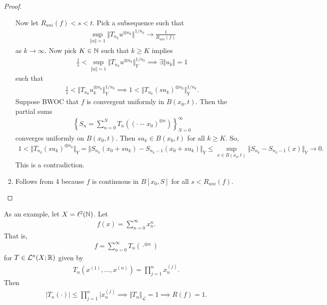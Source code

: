 \documentclass{report}
\begin{document}
\begin{proof}
\begin{enumerate}
        Now let $R_{uni}(f) < s < t$. Pick a subsequence such that 
        \begin{align*}
            \sup_{\Vert u \Vert = 1} \Vert T_{n_k} u^{\otimes n_k}\Vert^{1/n_k} \to \frac{1}{R_{uni}(f)}
        \end{align*}
        as $k \to \infty$. Now pick $K \in \NN$ such that $k \geq K$ implies 
        \begin{align*}
            \frac 1s < \sup_{\Vert u \Vert = 1} \Vert T_{n_k} u^{\otimes n_k}\Vert^{1/n_k}_Y \implies \exists \Vert u_k\Vert = 1
        \end{align*}
        such that 
        \begin{align*}
            \frac 1s < \Vert T_{n_k} u_k^{\otimes n_k}\Vert^{1/n_k}_Y \implies 1 < \Vert T_{n_k} (su_k)^{\otimes n_k}\Vert^{1/n_k}_Y.
        \end{align*}
        Suppose BWOC that $f$ is convergent uniformly in $B(x_0, t)$. Then the partial sums 
        \begin{align*}
            \left\{S_n = \sum_{n=0}^N T_n((\cdot - x_0)^{\otimes n})\right\}_{N=0}^\infty
        \end{align*}
        converges uniformly on $B(x_0, t)$. Then $su_k \in B(x_0, t)$ for all $k \geq K$. So,
        \begin{align*}
            1 < \Vert T_{n_k}(su_k)^{\otimes n_k} \Vert_Y = \Vert S_{n_k}(x_0 + su_k) - S_{n_k - 1}(x_0 + su_k)\Vert_Y \leq \sup_{x \in B(x_0, t)} \Vert S_{n_k} - S_{n_k - 1}(x) \Vert_Y \to 0.
        \end{align*}
        This is a contradiction.
        \item Follows from 4 because $f$ is continuous in $B[x_0, S]$ for all $s < R_{uni}(f)$.
    \end{enumerate}
\end{proof}
\newpage
As an example, let $X = \ell^2(\NN)$. Let 
\begin{align*}
    f(x) = \sum_{n=0}^\infty x_n^n.
\end{align*}
That is,
\begin{align*}
    f = \sum_{n=0}^\infty T_n(\cdot^{\otimes n})
\end{align*}
for $T \in \mathcal L^n(X; \RR)$ given by 
\begin{align*}
    T_n(x^{(1)}, \ldots, x^{(n)}) = \prod_{j=1}^n x^{(j)}_n.
\end{align*}
Then 
\begin{align*}
    |T_n(\cdot)| \leq \prod_{j=1}^n |x^{(j)}_n \implies \Vert T_n \Vert_{\mathcal L} = 1 \implies R(f) = 1.
\end{align*}
\end{document}
